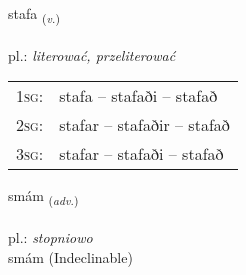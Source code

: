 \documentclass[frontgrid, backgrid]{flacards}\usepackage[]{graphicx}\usepackage[]{xcolor}
\begin{document}
\renewcommand{\flhead}{\vskip5pt \fboxsep=0pt {\small\bfseries\footnotesize Sagnorð | Verb}}
\renewcommand{\fcfoot}{\vskip5pt \fboxsep=0pt \hspace{2pt}{\small\bfseries\footnotesize 2K}}

\renewcommand{\blhead}{\vskip5pt {\small\bfseries\footnotesize Sagnorð | Verb }}
\renewcommand{\bcfoot}{\vskip5pt \hspace{2pt}{\small\bfseries\footnotesize 2K}}


{stafa \small{\textsubscript{(\textit{v.})}} \\[1ex] %
\textphonetic{[staːva]} \\
pl.: \emph{literować, przeliterować} \\  [2ex]
\renewcommand*{\arraystretch}{0.8}
\begin{tabular}{p{1cm}l}
\textsc{1sg}: & stafa -- stafaði -- stafað \\ 
\textsc{2sg}: & stafar -- stafaðir -- stafað \\ 
\textsc{3sg}: & stafar -- stafaði -- stafað \\ 
\end{tabular}
}


\renewcommand{\flhead}{\vskip5pt \fboxsep=0pt {\small\bfseries\footnotesize Atviksorð | Adverb}}
\renewcommand{\fcfoot}{\vskip5pt \fboxsep=0pt \hspace{2pt}{\small\bfseries\footnotesize 2K}}

\renewcommand{\blhead}{\vskip5pt {\small\bfseries\footnotesize Atviksorð | Adverb }}
\renewcommand{\bcfoot}{\vskip5pt \hspace{2pt}{\small\bfseries\footnotesize 2K}}


{smám \small{\textsubscript{(\textit{adv.})}} \\[1ex]
\textphonetic{[smauːm]} \\
pl.: \emph{stopniowo} \\  [2ex]
smám (Indeclinable)}
\end{document}
